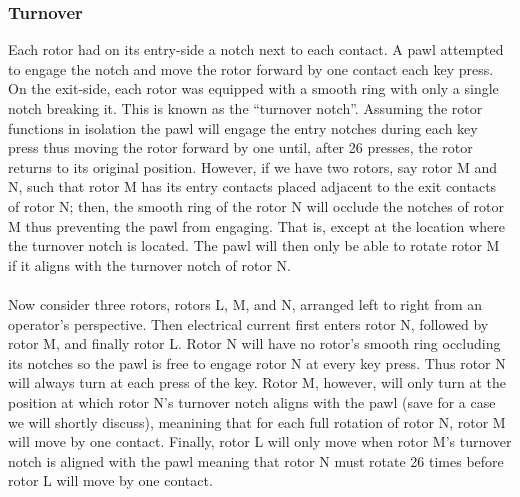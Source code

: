 \subsubsection{Turnover}
Each rotor had on its entry-side a notch next to each contact. A pawl
attempted to engage
the notch and move the rotor forward by one contact each key press.
On the exit-side, each
rotor was equipped with a smooth ring with only a single notch
breaking it. This is known as the ``turnover notch''. Assuming the
rotor functions in isolation the pawl will engage the entry notches
during each key press thus moving the rotor forward by one until,
after 26 presses, the rotor returns to its original position.
However, if we have two rotors, say rotor M and N, such that rotor M
has its entry contacts placed adjacent to the exit contacts of rotor
N; then, the smooth ring of the rotor N will occlude the notches of
rotor M thus preventing the pawl from engaging. That is, except at
the location where the turnover notch is located. The pawl will then
only be able to rotate rotor M if it aligns with the turnover notch of rotor N.
\\\\Now consider three rotors, rotors L, M, and N, arranged left to
right from an operator's perspective. Then electrical current first
enters rotor N, followed by rotor M, and finally rotor L. Rotor N
will have no rotor's smooth ring occluding its notches so the pawl is
free to engage rotor N at every key press. Thus rotor N will always
turn at each press of the key. Rotor M, however, will only turn at
the position at which rotor N's turnover notch aligns with the pawl
(save for a case we will shortly discuss),
meanining that for each full rotation of rotor N, rotor M will move
by one contact. Finally, rotor L will only move when rotor M's
turnover notch is aligned with the pawl meaning that rotor N must
rotate 26 times before rotor L will move by one contact.

